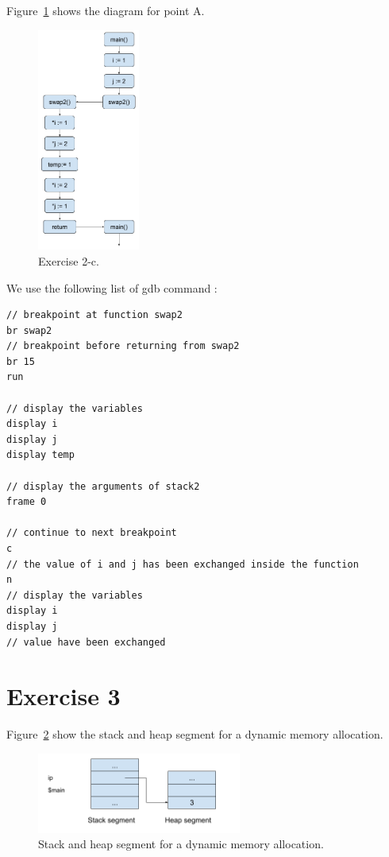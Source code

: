 \documentclass[a4paper,11pt]{report}
\begin{document}
Figure~\ref{fig:ex2-c} shows the diagram for point A.

\begin{figure}[ht]
  \centering
  \includegraphics[width=0.3\textwidth]{figures/SOP_s05_ex2_c}
  \caption{\label{fig:ex2-c} Exercise 2-c.}
\end{figure}

We use the following list of gdb command :

\begin{verbatim}
// breakpoint at function swap2
br swap2
// breakpoint before returning from swap2
br 15
run

// display the variables
display i
display j
display temp

// display the arguments of stack2
frame 0

// continue to next breakpoint
c
// the value of i and j has been exchanged inside the function
n
// display the variables
display i
display j
// value have been exchanged
\end{verbatim}

\FloatBarrier

\section*{Exercise 3}

Figure~\ref{fig:ex3} show the stack and heap segment for a dynamic memory allocation.

\begin{figure}[ht]
  \centering
  \includegraphics[width=0.6\textwidth]{figures/SOP_s05_ex3}
  \caption{\label{fig:ex3} Stack and heap segment for a dynamic memory allocation.}
\end{figure}
\end{document}
